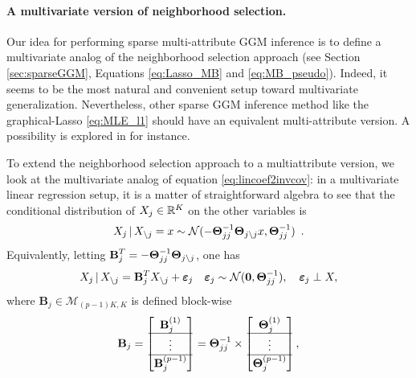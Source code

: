 \paragraph*{A multivariate version of neighborhood selection.}  Our
idea for performing sparse multi-attribute GGM inference is to define
a multivariate analog of the neighborhood selection approach
\cite{2006_AS_Meinshausen} (see Section \ref{sec:sparseGGM}, Equations
\eqref{eq:Lasso_MB} and \eqref{eq:MB_pseudo}). Indeed, it seems to be
the most natural and convenient setup toward multivariate
generalization.  Nevertheless, other sparse GGM inference method like
the graphical-Lasso \eqref{eq:MLE_l1} should have an equivalent
multi-attribute version. A possibility is explored in
\cite{kolar2014graph} for instance.

To extend the neighborhood selection approach to a multiattribute
version, we look at the multivariate analog of equation
\eqref{eq:lincoef2invcov}: in a multivariate linear regression setup,
it is a matter of straightforward algebra to see that the conditional
distribution of $X_j\in\mathbb{R}^K$ on the other variables is
\begin{equation*}
  X_j \, |\,  X_{\backslash j}  = x \sim  \mathcal{N}(- \boldsymbol\Theta_{jj}^{-1}\boldsymbol\Theta_{j
    \backslash j} x , \boldsymbol\Theta_{jj}^{-1})\enskip.
\end{equation*} 
Equivalently,     letting      $\displaystyle     \mathbf{B}_j^T     =
-\boldsymbol\Theta_{jj}^{-1} \boldsymbol\Theta_{j\backslash j}$, one has
\begin{equation*}
  X_j \, |\, X_{\backslash j} = \mathbf{B}_j^T X_{\backslash j} +
  \boldsymbol\varepsilon_j \quad \boldsymbol\varepsilon_j
  \sim \mathcal{N}(\mathbf{0},\boldsymbol\Theta_{jj}^{-1}), \quad \boldsymbol\varepsilon_j \perp X,
\end{equation*}
where $\mathbf{B}_j\in\mathcal{M}_{(p-1)K,K}$ is defined block-wise
\begin{equation*}
  \mathbf{B}_j = \begin{bmatrix}
    \mathbf{B}_j^{(1)} \\ \hline
    \vdots \\ \hline
    \mathbf{B}_j^{(p-1)} \\ 
  \end{bmatrix} = \boldsymbol\Theta_{jj}^{-1} \times \begin{bmatrix}
    \boldsymbol\Theta_j^{(1)} \\ \hline
    \vdots \\ \hline
    \boldsymbol\Theta_j^{(p-1)} \\ 
  \end{bmatrix},
\end{equation*}

